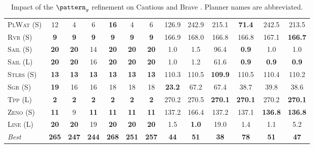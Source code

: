 \begin{table}[tb]
{\begin{tabular}{|l||cccccc||cccccc||}
\textsc{PlWat} (S)&12&4&6&\textbf{16}&4&6&126.9&242.9&215.1&\textbf{71.4}&242.5&213.5\\
\textsc{Rvr} (S)&\textbf{9}&\textbf{9}&\textbf{9}&\textbf{9}&\textbf{9}&\textbf{9}&166.9&168.0&166.8&166.8&167.1&\textbf{166.7}\\
\textsc{Sail} (S)&\textbf{20}&\textbf{20}&14&\textbf{20}&\textbf{20}&\textbf{20}&1.0&1.5&96.4&\textbf{0.9}&1.0&1.0\\
\textsc{Sail} (L)&\textbf{20}&\textbf{20}&16&\textbf{20}&\textbf{20}&\textbf{20}&1.0&1.2&61.6&\textbf{0.9}&\textbf{0.9}&\textbf{0.9}\\
\textsc{Stlrs} (S)&\textbf{13}&\textbf{13}&\textbf{13}&\textbf{13}&\textbf{13}&\textbf{13}&110.3&110.5&\textbf{109.9}&110.5&110.4&110.2\\
\textsc{Sgr} (S)&\textbf{19}&16&16&18&18&18&\textbf{23.2}&67.2&67.4&38.7&39.8&38.6\\
\textsc{Tpp} (L)&\textbf{2}&\textbf{2}&\textbf{2}&\textbf{2}&\textbf{2}&\textbf{2}&270.2&270.5&\textbf{270.1}&\textbf{270.1}&270.2&\textbf{270.1}\\
\textsc{Zeno} (S)&\textbf{11}&9&\textbf{11}&\textbf{11}&\textbf{11}&\textbf{11}&137.2&166.4&137.2&137.1&\textbf{136.8}&\textbf{136.8}\\
\textsc{Line} (L)&\textbf{20}&\textbf{20}&19&\textbf{20}&\textbf{20}&\textbf{20}&1.5&\textbf{1.0}&19.0&1.4&1.1&5.2
\\\hline
\textit{Best}&\textbf{265}&\textbf{247}&\textbf{244}&\textbf{268}&\textbf{251}&\textbf{257}&\textbf{44}&\textbf{51}&\textbf{38}&\textbf{78}&\textbf{51}&\textbf{47}\\\hline

        \end{tabular}}
        \caption{Impact of the $\pattern_g$ refinement on Cautious and Brave \pattyd. Planner names are abbreviated.}
        \label{tab:abl-patterng}
        \end{table}
        